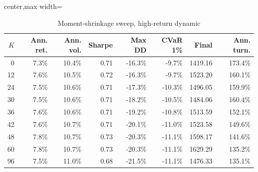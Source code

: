 \begin{table}[!htbp]
\centering
\caption{Moment-shrinkage sweep, high-return dynamic}
\label{tab:allocation-moment-shrinkage-high-return}
\small
\setlength{\tabcolsep}{5pt}
\renewcommand{\arraystretch}{1.12}
\begin{adjustbox}{center,max width=\linewidth}
\begin{tabular}{rrrrrrrr}
\toprule
$K$ & Ann. ret. & Ann. vol. & Sharpe & Max DD & CVaR 1\% & Final & Ann. turn. \\
\midrule
0 & 7.3\% & 10.4\% & 0.71 & -16.3\% & -9.7\% & 1419.16 & 173.4\% \\
12 & 7.6\% & 10.5\% & 0.72 & -16.3\% & -9.7\% & 1523.20 & 160.1\% \\
24 & 7.5\% & 10.6\% & 0.71 & -17.3\% & -10.3\% & 1496.05 & 159.9\% \\
30 & 7.5\% & 10.6\% & 0.71 & -18.2\% & -10.5\% & 1484.06 & 160.4\% \\
36 & 7.6\% & 10.6\% & 0.71 & -19.2\% & -10.8\% & 1513.59 & 152.1\% \\
42 & 7.6\% & 10.7\% & 0.71 & -20.1\% & -11.0\% & 1523.58 & 149.6\% \\
48 & 7.8\% & 10.7\% & 0.73 & -20.3\% & -11.1\% & 1598.17 & 141.6\% \\
60 & 7.8\% & 10.7\% & 0.73 & -20.3\% & -11.1\% & 1629.29 & 135.2\% \\
96 & 7.5\% & 11.0\% & 0.68 & -21.5\% & -11.1\% & 1476.33 & 135.1\% \\
\bottomrule
\end{tabular}
\end{adjustbox}
\end{table}